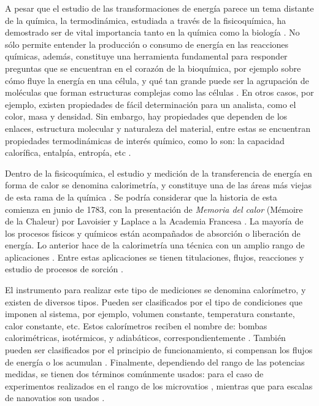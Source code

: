 	A pesar que el estudio de las transformaciones de energía parece un tema distante de la química, la termodinámica, estudiada a través de la fisicoquímica, ha demostrado ser de vital importancia tanto en la química como la biología \cite{atkins2011physical}. No sólo permite entender la producción o consumo de energía en las reacciones químicas, además, constituye una herramienta fundamental para responder preguntas que se encuentran en el corazón de la bioquímica, por ejemplo sobre cómo fluye la energía en una célula, y qué tan grande puede ser la agrupación de moléculas que forman estructuras complejas como las células \cite{atkins2011physical}. En otros casos, por ejemplo, existen propiedades de fácil determinación para un analista, como el color, masa y densidad. Sin embargo, hay propiedades que dependen de los enlaces, estructura molecular y naturaleza del material, entre estas se encuentran propiedades termodinámicas de interés químico, como lo son: la capacidad calorífica, entalpía, entropía, etc \cite{gaisford2016principles}.
	
	Dentro de la fisicoquímica, el estudio y medición de la transferencia de energía en forma de calor se denomina calorimetría, y constituye una de las áreas más viejas de esta rama de la química \cite{zielenkiewicz2006theory}. Se podría considerar que la historia de esta comienza en junio de 1783, con la presentación de \textit{Memoria del calor} (Mémoire de la Chaleur) por Lavoisier y Laplace a la Academia Francesa \cite{zielenkiewicz2006theory}. La mayoría de los procesos físicos y químicos están acompañados de absorción o liberación de energía. Lo anterior hace de la calorimetría una técnica con un amplio rango de aplicaciones \cite{wadso2001standards}. Entre estas aplicaciones se tienen titulaciones, flujos, reacciones y estudio de procesos de sorción \cite{gaisford2016principles}.
		
	El instrumento para realizar este tipo de mediciones se denomina calorímetro, y existen de diversos tipos. Pueden ser clasificados por el tipo de condiciones que imponen al sistema, por ejemplo, volumen constante, temperatura constante, calor constante, etc. Estos calorímetros reciben el nombre de: bombas calorimétricas, isotérmicos, y adiabáticos, correspondientemente \cite{gaisford2016principles, wadso2001standards}. También pueden ser clasificados por el principio de funcionamiento, si compensan los flujos de energía o los acumulan \cite{gaisford2016principles}. Finalmente, dependiendo del rango de las potencias medidas, se tienen dos términos comúnmente usados:  para el caso de experimentos realizados en el rango de los microvatios \cite{wadso2001standards, wadso2003new}, mientras que para escalas de nanovatios son usados  \cite{wadso2003new}.
	
